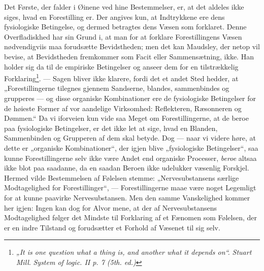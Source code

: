 \documentclass[12pt,a4paper,openany]{book}
\newcommand{\opage}[1]{\marginnote{\footnotesize\textit{[#1]}}}
\begin{document}
Det Første, der falder i Øinene ved hine Bestemmelser,
er, at det aldeles ikke siges, hvad en Forestilling er. Der
angives kun, at Indtrykkene ere dens fysiologiske Betingelse,
og dermed betragtes dens Væsen som forklaret. Denne
Overfladiskhed har sin Grund i, at man for at forklare
Forestillingens Væsen nødvendigviis maa forudsætte Bevidstheden;
men det kan Maudsley, der netop vil bevise, at Bevidstheden
fremkommer som Facit eller Sammensætning, ikke.
Han holder sig da til de empiriske Betingelser og anseer
dem for en tilstrækkelig Forklaring\footnote{\textit{„It is one question what a thing is, and another what it depends on“.} \emph{\textit{Stuart Mill}}. \textit{System of logic. II p. 7 (5th. ed.)}}. --- Sagen bliver ikke
klarere, fordi det et andet Sted hedder, at „Forestillingerne
tilegnes gjennem Sandserne, blandes, sammenbindes og grupperes
--- og disse organiske Kombinationer ere de fysiologiske
\opage{318}Betingelser for de høieste Former af vor aandelige Virksomhed:
Reflekteren, Ræsonneren og Dømmen.“ Da vi
iforveien kun vide saa Meget om Forestillingerne, at de beroe
paa fysiologiske Betingelser, er det ikke let at sige, hvad en
Blanden, Sammenbinden og Grupperen af dem skal betyde.
Dog --- naar vi videre høre, at dette er „organiske Kombinationer“,
der igjen blive „fysiologiske Betingelser“, saa
kunne Forestillingerne selv ikke være Andet end organiske
Processer, \emph{beroe} altsaa ikke blot paa saadanne, da en saadan
Beroen ikke udelukker væsenlig Forskjel. Hermed vilde Bestemmelsen
af Følelsen stemme: „Nervesubstansens særlige
Modtagelighed for Forestillinger“, --- Forestillingerne maae
være noget Legemligt for at kunne paavirke Nervesubstansen.
Men den samme Vanskelighed kommer her igjen: Ingen kan
dog for Alvor mene, at der af Nervesubstansens Modtagelighed
følger det Mindste til Forklaring af et Fænomen
som Følelsen, der er en indre Tilstand og forudsætter et
Forhold af Væsenet til sig selv.
\end{document}
